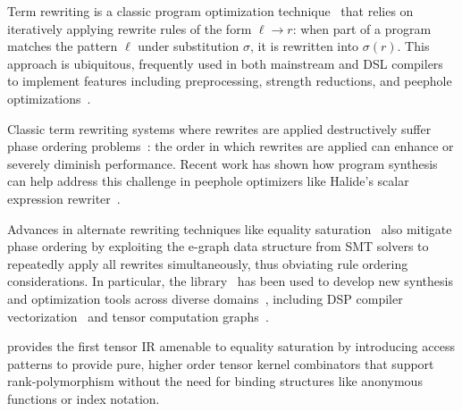 Term rewriting is a classic
  program optimization technique~\cite{baader1998term}
  that relies on iteratively applying
  rewrite rules of the form $\ell \xrightarrow{} r$:
  when part of a program
  matches the pattern $\ell$
  under substitution $\sigma$,
  it is rewritten into $\sigma(r)$.
This approach is ubiquitous,
  frequently used in both mainstream and DSL compilers
  to implement features including preprocessing,
  strength reductions, and
  peephole optimizations~\cite{garavel2018rewrite-context}.
  
Classic term rewriting systems where
  rewrites are applied destructively suffer
  phase ordering problems~\cite{phase-ordering}:
  the order in which rewrites are applied can
  enhance or severely diminish performance.
Recent work has shown how program synthesis
  can help address this challenge in
  peephole optimizers like Halide's
  scalar expression rewriter~\cite{
    newcomb2020halide-rewrite}.
  
Advances in alternate rewriting techniques
  like equality saturation~\cite{tate2009equality}
  also mitigate phase ordering by exploiting
  the e-graph data structure from SMT solvers
  to repeatedly apply all rewrites simultaneously,
  thus obviating rule ordering considerations.
In particular,
  the  library~\cite{willsey2021egg}
  has been used to develop new synthesis and
  optimization tools across diverse domains~\cite{
    herbie, szalinski, wang2020spores},
  including DSP compiler vectorization~\cite{
    vanhattum2021vectorization} and
  tensor computation graphs~\cite{yang2021equality}.

\g provides the first tensor IR
  amenable to equality saturation by
  introducing access patterns to
  provide pure, higher order tensor
  kernel combinators that support
  rank-polymorphism without the need
  for binding structures like
  anonymous functions or index notation.


  

